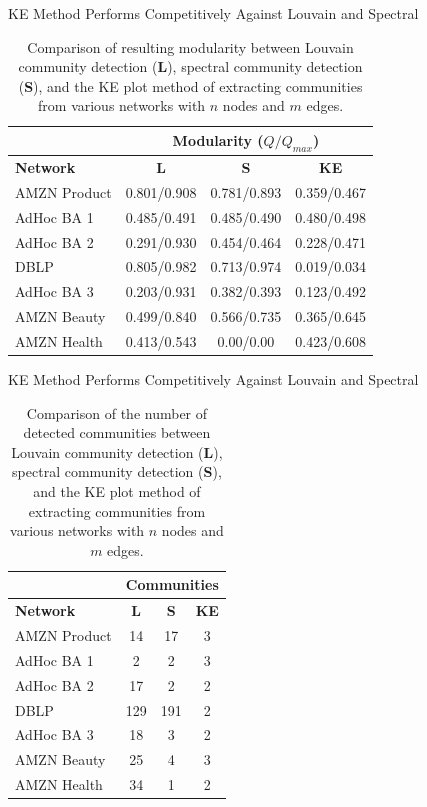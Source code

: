 \documentclass[aspectratio=169,11pt]{beamer}
\begin{document}
\begin{frame}{KE Method Performs Competitively Against Louvain and Spectral}
	\begin{table}
		\centering
		\begin{tabular}{lccc}
			\toprule
			& \multicolumn{3}{c}{\textbf{Modularity ($Q/Q_{max}$)}}\\
			\midrule
			\textbf{Network} & \textbf{L} & \textbf{S} & \textbf{KE}\\
			\midrule
			AMZN Product&  0.801/0.908 & 0.781/0.893 & 0.359/0.467 \\
			AdHoc BA 1  &  0.485/0.491 & 0.485/0.490 & 0.480/0.498 \\
			AdHoc BA 2  &  0.291/0.930 & 0.454/0.464 & 0.228/0.471 \\
			DBLP        &  0.805/0.982 & 0.713/0.974 & 0.019/0.034 \\
			AdHoc BA 3  & 0.203/0.931 & 0.382/0.393 & 0.123/0.492 \\
			AMZN Beauty & 0.499/0.840 & 0.566/0.735 & 0.365/0.645 \\
			AMZN Health & 0.413/0.543 & 0.00/0.00 & 0.423/0.608 \\
			\bottomrule
		\end{tabular}
		\caption{Comparison of resulting modularity between Louvain community detection (\textbf{L}), spectral community detection (\textbf{S}), and the KE plot method of extracting communities from various networks with $n$ nodes and $m$ edges.}
		\label{tab:quality}
	\end{table}
\end{frame}

\begin{frame}{KE Method Performs Competitively Against Louvain and Spectral}
	\begin{table}
		\centering
		\begin{tabular}{lccc}
			\toprule
			& \multicolumn{3}{c}{\textbf{Communities}}\\
			\midrule
			\textbf{Network} & \textbf{L} & \textbf{S} & \textbf{KE} \\
			\midrule
			AMZN Product&  14 & 17 & 3\\
			AdHoc BA 1  &  2 & 2 & 3\\
			AdHoc BA 2  &  17 & 2 & 2\\
			DBLP        &  129 & 191 & 2\\
			AdHoc BA 3  &  18 & 3 & 2\\
			AMZN Beauty &  25 & 4 & 3\\
			AMZN Health &  34 & 1 & 2\\
			\bottomrule
		\end{tabular}
		\caption{Comparison of the number of detected communities between Louvain community detection (\textbf{L}), spectral community detection (\textbf{S}), and the KE plot method of extracting communities from various networks with $n$ nodes and $m$ edges.}
		\label{tab:quality}
	\end{table}
\end{frame}
\end{document}
